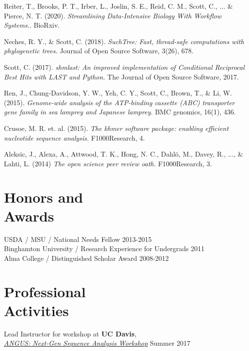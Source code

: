 \documentclass[resmargin,12pt]{camille_resume}
\begin{document}
\begin{resume}
Reiter, T., Brooks, P. T., Irber, L., Joslin, S. E., Reid, C. M., Scott, C., ... \& Pierce, N. T. (2020). {\em Streamlining Data-Intensive Biology With Workflow Systems.}. BioRxiv.

Neches, R. Y., \& Scott, C. (2018). {\em SuchTree: Fast, thread-safe computations with phylogenetic trees.} Journal of Open Source Software, 3(26), 678.

Scott, C. (2017). {\em shmlast: An improved implementation of Conditional Reciprocal Best Hits with LAST and Python.} The Journal of Open Source Software, 2017.

Ren, J., Chung-Davidson, Y. W., Yeh, C. Y., Scott, C., Brown, T., \& Li, W. (2015). {\em Genome-wide analysis of the ATP-binding cassette (ABC) transporter gene family in sea lamprey and Japanese lamprey.} BMC genomics, 16(1), 436.

Crusoe, M. R. et. al. (2015). {\em The khmer software package: enabling efficient nucleotide sequence analysis.} F1000Research, 4.

Aleksic, J., Alexa, A., Attwood, T. K., Hong, N. C., Dahlö, M., Davey, R., ..., \& Lahti, L. (2014)
{\em The open science peer review oath.} F1000Research, 3.

\pagebreak

\section{\mysidestyle Honors and\\Awards} 

USDA / MSU /  National Needs Fellow \hfill 2013-2015\\
Binghamton University / Research Experience for Undergrads \hfill 2011\\
Alma College / Distinguished Scholar Award \hfill 2008-2012\\

\section{\mysidestyle Professional\\Activities}

\begin{list1}
\item[] Lead Instructor for workshop at {\bf UC Davis},\\
{\em \href{https://angus.readthedocs.io/en/2017/}{ANGUS: Next-Gen Sequence Analysis Workshop}} \hfill Summer 2017\\


\end{list1}
\end{resume}
\end{document}
